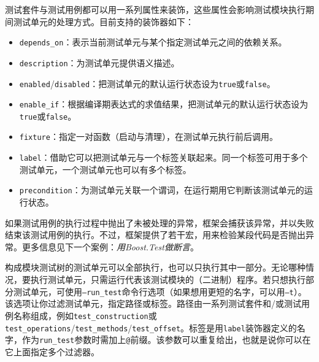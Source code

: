 
测试套件与测试用例都可以用一系列属性来装饰，这些属性会影响测试模块执行期间测试单元的处理方式。目前支持的装饰器如下：



\begin{itemize}
\item \texttt{depends\_\allowbreak{}on}：表示当前测试单元与某个指定测试单元之间的依赖关系。



\item \texttt{description}：为测试单元提供语义描述。



\item \texttt{enabled}/\texttt{disabled}：把测试单元的默认运行状态设为\texttt{true}或\texttt{false}。



\item \texttt{enable\_\allowbreak{}if}：根据编译期表达式的求值结果，把测试单元的默认运行状态设为\texttt{true}或\texttt{false}。



\item \texttt{fixture}：指定一对函数（启动与清理），在测试单元执行前后调用。



\item \texttt{label}：借助它可以把测试单元与一个标签关联起来。同一个标签可用于多个测试单元，一个测试单元也可以有多个标签。



\item \texttt{precondition}：为测试单元关联一个谓词，在运行期用它判断该测试单元的运行状态。


\end{itemize}



如果测试用例的执行过程中抛出了未被处理的异常，框架会捕获该异常，并以失败结束该测试用例的执行。不过，框架提供了若干宏，用来检验某段代码是否抛出异常。更多信息见下一个案例：\textit{用Boost.Test做断言}。


构成模块测试树的测试单元可以全部执行，也可以只执行其中一部分。无论哪种情况，要执行测试单元，只需运行代表该测试模块的（二进制）程序。若只想执行部分测试单元，可使用\texttt{--\allowbreak{}run\_\allowbreak{}test}命令行选项（如果想用更短的名字，可以用\texttt{--\allowbreak{}t}）。该选项让你过滤测试单元，指定路径或标签。路径由一系列测试套件和/或测试用例名称组成，例如\texttt{test\_\allowbreak{}construction}或\texttt{test\_\allowbreak{}operations}/\texttt{test\_\allowbreak{}methods}/\texttt{test\_\allowbreak{}offset}。标签是用\texttt{label}装饰器定义的名字，作为\texttt{run\_\allowbreak{}test}参数时需加上\texttt{@}前缀。该参数可以重复给出，也就是说你可以在它上面指定多个过滤器。


